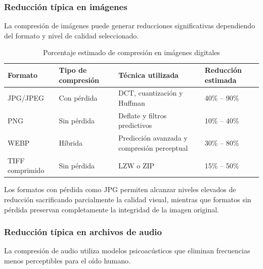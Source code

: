 \documentclass[12pt, oneside, letterpaper]{book}
\begin{document}
\subsubsection{Reducción típica en imágenes}

La compresión de imágenes puede generar reducciones significativas dependiendo del formato y nivel de calidad seleccionado.

\begin{table}[H]
\centering
\caption{Porcentaje estimado de compresión en imágenes digitales}
\label{tab:compresion_imagenes}
\renewcommand{\arraystretch}{1.4}
\begin{tabularx}{\textwidth}{|p{3cm}|p{3.5cm}|X|p{3cm}|}
\hline
\textbf{Formato} & \textbf{Tipo de compresión} & \textbf{Técnica utilizada} & \textbf{Reducción estimada} \\
\hline

JPG/JPEG & Con pérdida & DCT, cuantización y Huffman & 40\% -- 90\% \\
\hline

PNG & Sin pérdida & Deflate y filtros predictivos & 10\% -- 40\% \\
\hline

WEBP & Híbrida & Predicción avanzada y compresión perceptual & 30\% -- 80\% \\
\hline

TIFF comprimido & Sin pérdida & LZW o ZIP & 15\% -- 50\% \\
\hline

\end{tabularx}
\end{table}

Los formatos con pérdida como JPG permiten alcanzar niveles elevados de reducción sacrificando parcialmente la calidad visual, mientras que formatos sin pérdida preservan completamente la integridad de la imagen original.

\subsubsection{Reducción típica en archivos de audio}

La compresión de audio utiliza modelos psicoacústicos que eliminan frecuencias menos perceptibles para el oído humano.
\end{document}
